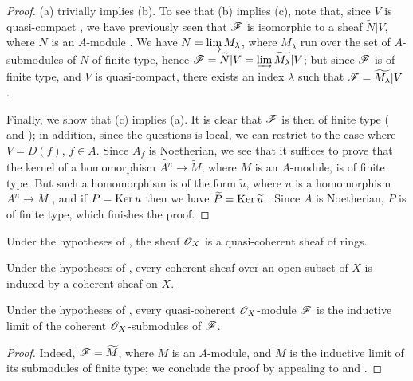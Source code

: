\begin{proof}
(a) trivially implies (b).
To see that (b) implies (c), note that, since $V$ is quasi-compact , we have previously seen that $\mathscr{F}$ is isomorphic to a sheaf $\widetilde{N}|V$, where $N$ is an $A$-module .
We have $N=\varinjlim M_\lambda$, where $M_\lambda$ run over the set of $A$-submodules of $N$ of finite type, hence  $\mathscr{F}=\widetilde{N}|V=\varinjlim\widetilde{M_\lambda}|V$;
but since $\mathscr{F}$ is of finite type, and $V$ is quasi-compact, there exists an index $\lambda$ such that $\mathscr{F}=\widetilde{M_\lambda}|V$ .

Finally, we show that (c) implies (a).
It is clear that $\mathscr{F}$ is then of finite type ( and );
in addition, since the questions is local, we can restrict to the case where $V=D(f)$, $f\in A$.
Since $A_f$ is Noetherian, we see that it suffices to prove that the kernel of a homomorphism $\widetilde{A^n}\to\widetilde{M}$, where $M$ is an $A$-module, is of finite type.
But such a homomorphism is of the form $\widetilde{u}$, where $u$ is a homomorphism $A^n\to M$ , and if $P=\operatorname{Ker} u$ then we have $\widetilde{P}=\operatorname{Ker}\widetilde{u}$ .
Since $A$ is Noetherian, $P$ is of finite type, which finishes the proof.
\end{proof}

\begin{corollary}[1.5.2]
\label{I.1.5.2}
Under the hypotheses of , the sheaf $\mathscr{O}_X$ is a quasi-coherent sheaf of rings.
\end{corollary}

\begin{corollary}[1.5.3]
\label{I.1.5.3}
Under the hypotheses of , every coherent sheaf over an open subset of $X$ is induced by a coherent sheaf on $X$.
\end{corollary}

\begin{corollary}[1.5.4]
\label{I.1.5.4}
Under the hypotheses of , every quasi-coherent $\mathscr{O}_X$-module $\mathscr{F}$ is the inductive limit of the coherent $\mathscr{O}_X$-submodules of $\mathscr{F}$.
\end{corollary}

\begin{proof}
Indeed, $\mathscr{F}=\widetilde{M}$, where $M$ is an $A$-module, and $M$ is the inductive limit of its submodules of finite type;
we conclude the proof by appealing to  and .
\end{proof}

